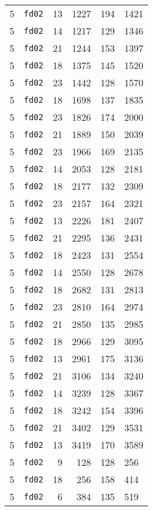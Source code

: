 \documentclass{article}
\begin{document}
\begin{table}[h!]
\begin{tabular}{llrrrl}
    5 & \texttt{fd02} & 13 & 1227 & 194 & 1421 \\
    5 & \texttt{fd02} & 14 & 1217 & 129 & 1346 \\
    5 & \texttt{fd02} & 21 & 1244 & 153 & 1397 \\
    5 & \texttt{fd02} & 18 & 1375 & 145 & 1520 \\
    5 & \texttt{fd02} & 23 & 1442 & 128 & 1570 \\
    5 & \texttt{fd02} & 18 & 1698 & 137 & 1835 \\
    5 & \texttt{fd02} & 23 & 1826 & 174 & 2000 \\
    5 & \texttt{fd02} & 21 & 1889 & 150 & 2039 \\
    5 & \texttt{fd02} & 23 & 1966 & 169 & 2135 \\
    5 & \texttt{fd02} & 14 & 2053 & 128 & 2181 \\
    5 & \texttt{fd02} & 18 & 2177 & 132 & 2309 \\
    5 & \texttt{fd02} & 23 & 2157 & 164 & 2321 \\
    5 & \texttt{fd02} & 13 & 2226 & 181 & 2407 \\
    5 & \texttt{fd02} & 21 & 2295 & 136 & 2431 \\
    5 & \texttt{fd02} & 18 & 2423 & 131 & 2554 \\
    5 & \texttt{fd02} & 14 & 2550 & 128 & 2678 \\
    5 & \texttt{fd02} & 18 & 2682 & 131 & 2813 \\
    5 & \texttt{fd02} & 23 & 2810 & 164 & 2974 \\
    5 & \texttt{fd02} & 21 & 2850 & 135 & 2985 \\
    5 & \texttt{fd02} & 18 & 2966 & 129 & 3095 \\
    5 & \texttt{fd02} & 13 & 2961 & 175 & 3136 \\
    5 & \texttt{fd02} & 21 & 3106 & 134 & 3240 \\
    5 & \texttt{fd02} & 14 & 3239 & 128 & 3367 \\
    5 & \texttt{fd02} & 18 & 3242 & 154 & 3396 \\
    5 & \texttt{fd02} & 21 & 3402 & 129 & 3531 \\
    5 & \texttt{fd02} & 13 & 3419 & 170 & 3589 \\
    5 & \texttt{fd02} & 9 & 128 & 128 & 256 \\
    5 & \texttt{fd02} & 18 & 256 & 158 & 414 \\
    5 & \texttt{fd02} & 6 & 384 & 135 & 519 \\

\end{tabular}
\end{table}
\end{document}
